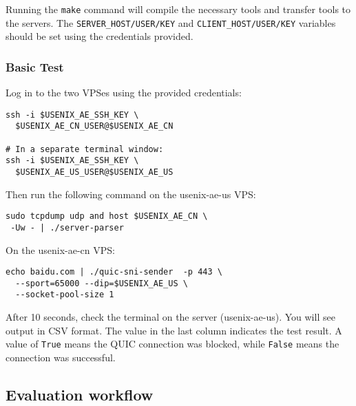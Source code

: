Running the \texttt{make} command will compile the necessary tools and transfer tools
to the servers. The \texttt{SERVER\_HOST/USER/KEY} and \texttt{CLIENT\_HOST/USER/KEY} variables
should be set using the credentials provided.



\subsubsection{Basic Test}

Log in to the two VPSes using the provided credentials:
\begin{verbatim}
ssh -i $USENIX_AE_SSH_KEY \ 
  $USENIX_AE_CN_USER@$USENIX_AE_CN

# In a separate terminal window:
ssh -i $USENIX_AE_SSH_KEY \
  $USENIX_AE_US_USER@$USENIX_AE_US
\end{verbatim}


\noindent Then run the following command on the usenix-ae-us VPS:
\begin{verbatim}
sudo tcpdump udp and host $USENIX_AE_CN \
 -Uw - | ./server-parser
\end{verbatim}     


\noindent On the usenix-ae-cn VPS:
\begin{verbatim}
echo baidu.com | ./quic-sni-sender  -p 443 \ 
  --sport=65000 --dip=$USENIX_AE_US \ 
  --socket-pool-size 1
\end{verbatim}

\noindent After 10 seconds, check the terminal on the server (usenix-ae-us).
You will see output in CSV format. The value in the last
column indicates the test result. A value of \texttt{True} means the
QUIC connection was blocked, while \texttt{False} means
the connection was successful.




\subsection{Evaluation workflow}

